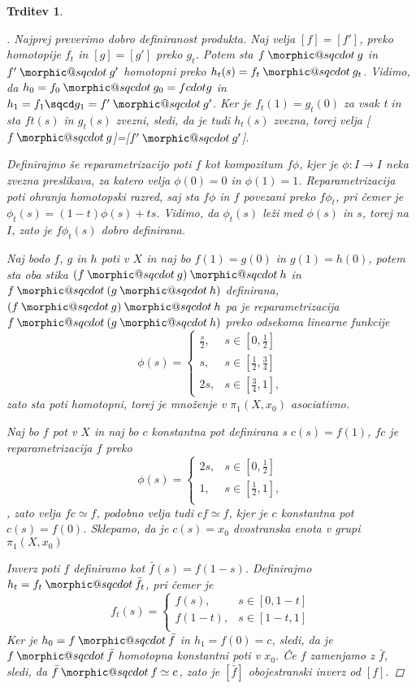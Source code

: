 \documentclass[a4paper,12pt]{article}
\makeatletter
\DeclareRobustCommand{\sqcdot}{\mathbin{\mathpalette\morphic@sqcdot\relax}}
\newcommand{\morphic@sqcdot}[2]{%
\sbox\z@{$\m@th#1\centerdot$}%
\ht\z@=.33333\ht\z@
\vcenter{\box\z@}%
}
\theoremstyle{definition}
\theoremstyle{plain}
\theoremstyle{definition}
\theoremstyle{plain}
\newtheorem{trditev}{Trditev}
\theoremstyle{plain}
\theoremstyle{plain}
\theoremstyle{plain}
\newenvironment{dokaz}{\begin{proof}[\bfseries\upshape\proofname]}{\end{proof}}
\makeatother
\begin{document}
\begin{trditev}
\begin{dokaz}
    Najprej preverimo dobro definiranost produkta. Naj velja $[f]=[f']$, preko homotopije $f_t$ in $[g]=[g']$ preko $g_t$. Potem sta $f\sqcdot g$ in $f'\sqcdot g'$ homotopni preko
    $h_t(s) =f_t \sqcdot g_t$. Vidimo, da $h_0=f_0 \sqcdot g_0=f cdot g$ in $h_1=f_1 \sqcd g_1=f'\sqcdot g'$. Ker je $f_t(1)=g_t(0)$ za vsak t in sta $ft(s)$ in $g_t(s)$ zvezni, sledi, da je tudi $h_t(s)$ zvezna, torej velja [$f\sqcdot g$]=[$f'\sqcdot g'$].

    Definirajmo še \textit{reparametrizacijo} poti $f$ kot kompozitum $f 
    \phi$, kjer je $\phi: I \rightarrow I$ neka zvezna preslikava, za 
    katero velja $\phi(0)= 0$ in $\phi(1)=1$. Reparametrizacija poti 
    ohranja homotopski razred, saj sta $f\phi$ in $f$ povezani preko 
    $f\phi_t$, pri čemer je $\phi_t(s)=(1-t)\phi(s)+ts$. Vidimo, da 
    $\phi_t(s)$ leži med $\phi(s)$ in $s$, torej na $I$, zato je 
    $f\phi_t(s)$ dobro definirana.

    Naj bodo $f$, $g$ in $h$ poti v $X$ in naj bo $f(1)=g(0)$ in 
    $g(1)=h(0)$, potem sta oba stika $(f\sqcdot g) \sqcdot h$ in 
    $f\sqcdot (g \sqcdot h)$ definirana, $(f\sqcdot g) \sqcdot h$ pa je
     reparametrizacija $f\sqcdot (g \sqcdot h)$ preko odsekoma linearne 
     funkcije
    $$
    \phi(s)=\begin{cases}
        \frac{s}{2}, &s \in [0,\frac{1}{2}] \\
        s, & s \in [\frac{1}{2},\frac{3}{4}]\\
        2s, & s \in [\frac{3}{4},1],
    \end{cases}
    $$ zato sta poti homotopni, torej je množenje v $\pi_1(X,x_0)$ asociativno.

    Naj bo $f$ pot v $X$ in naj bo $c$ konstantna pot definirana s $c(s)=f(1)$, $fc$ je reparametrizacija $f$ preko 
    $$\phi(s)=\begin{cases}
        2s, &s \in [0,\frac{1}{2}] \\
        1, & s \in [\frac{1}{2},1],\\
        \end{cases}
    $$, zato velja $fc\simeq f$, podobno velja tudi  $cf\simeq f$, kjer je $c$ konstantna pot $c(s)=f(0)$. Sklepamo, da je $c(s)=x_0$ dvostranska enota v grupi  $\pi_1(X,x_0)$

    Inverz poti $f$ definiramo kot $\bar{f}(s)=f(1-s)$. Definirajmo $h_t=f_t\sqcdot \bar{f_t}$, pri čemer je 
    $$
    f_t(s)=
    \begin{cases}
        f(s), &s \in [0,1-t] \\
        f(1-t), & s \in [1-t,1] \\
        \end{cases}
$$
Ker je $h_0=f\sqcdot \bar{f}$ in $h_1=f(0)=c$, sledi, da je $f\sqcdot \bar{f}$ homotopna konstantni poti v $x_0$. Če $f$ zamenjamo z $\bar{f}$, sledi, da $\bar{f}\sqcdot f\simeq c$, zato je $[\bar{f}]$ obojestranski inverz od $[f]$.
\end{dokaz}


\end{trditev}
\end{document}
